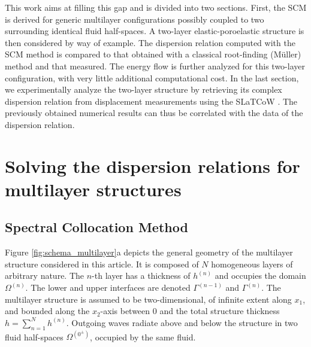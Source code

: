 This work aims at filling this gap and is divided into two sections. First, the SCM is derived for generic multilayer configurations possibly coupled to two surrounding identical fluid half-spaces. A two-layer elastic-poroelastic structure is then considered by way of example. The dispersion relation computed with the SCM method is compared to that obtained with a classical root-finding (M\"uller) method and that measured. The energy flow is further analyzed for this two-layer configuration, with very little additional computational cost. In the last section, we experimentally analyze the two-layer structure by retrieving its complex dispersion relation from displacement measurements using the SLaTCoW . The previously obtained numerical results can thus be correlated with the data of the dispersion relation.
    
\section{Solving the dispersion relations for multilayer structures}
\label{sec:method}
    
\subsection{Spectral Collocation Method}
Figure \ref{fig:schema_multilayer}a depicts the general geometry of the multilayer structure considered in this article. It is composed of $N$ homogeneous layers of arbitrary nature. The $n$-th layer has a thickness of $h^{(n)}$ and occupies the domain $\Omega^{(n)}$. The lower and upper interfaces are denoted $\Gamma^{(n-1)}$ and $\Gamma^{(n)}$. The multilayer structure is assumed to be two-dimensional, of infinite extent along $x_1$, and bounded along the $x_2 $-axis between $0$ and the total structure thickness $h = \sum_{n=1}^N h^{(n)}$. Outgoing waves radiate above and below the structure in two fluid half-spaces $\Omega^{(0^\pm)}$, occupied by the same fluid.
    
